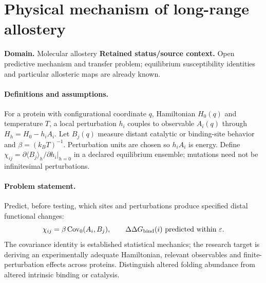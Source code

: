 \documentclass[11pt]{article}
\begin{document}
\section*{Physical mechanism of long-range allostery}
\label{prob:082}
\label{rank:66}
\par\smallskip

\noindent\textbf{Domain.} Molecular allostery \quad \textbf{Retained status/source context.} Open predictive mechanism and transfer problem; equilibrium susceptibility identities and particular allosteric maps are already known.
\paragraph{Definitions and assumptions.} For a protein with configurational coordinate $q$, Hamiltonian $H_0(q)$ and temperature $T$, a local perturbation $h_i$ couples to observable $A_i(q)$ through $H_h=H_0-h_iA_i$. Let $B_j(q)$ measure distant catalytic or binding-site behavior and $\beta=(k_BT)^{-1}$. Perturbation units are chosen so $h_iA_i$ is energy. Define $\chi_{ij}=\partial\langle B_j\rangle_h/\partial h_i|_{h=0}$ in a declared equilibrium ensemble; mutations need not be infinitesimal perturbations.
\paragraph{Problem statement.} Predict, before testing, which sites and perturbations produce specified distal functional changes:
\[\chi_{ij}=\beta\operatorname{Cov}_{0}(A_i,B_j),\qquad \Delta\Delta G_{\rm bind}(i)\ \text{predicted within }\varepsilon.\]
The covariance identity is established statistical mechanics; the research target is deriving an experimentally adequate Hamiltonian, relevant observables and finite-perturbation effects across proteins. Distinguish altered folding abundance from altered intrinsic binding or catalysis.
\end{document}
